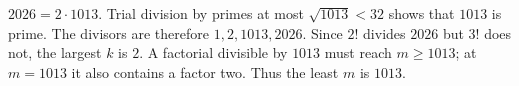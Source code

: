 $2026=2\cdot1013$. Trial division by primes at most $\sqrt{1013}<32$ shows that $1013$ is prime. The divisors are therefore $1,2,1013,2026$. Since $2!$ divides $2026$ but $3!$ does not, the largest $k$ is $2$. A factorial divisible by $1013$ must reach $m\ge1013$; at $m=1013$ it also contains a factor two. Thus the least $m$ is $1013$.
